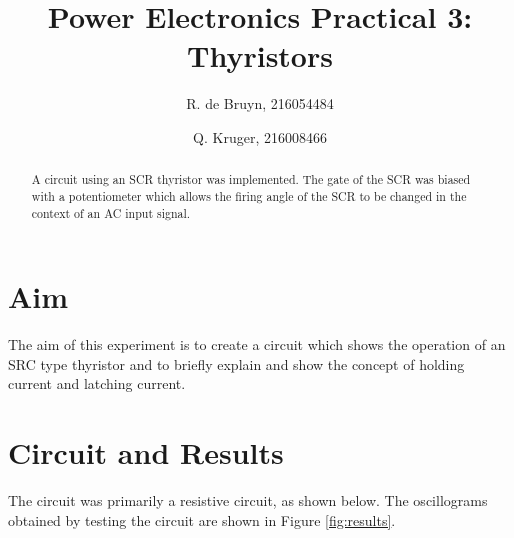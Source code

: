 \documentclass[journal]{IEEEtran}
\begin{document}
%
\title{Power Electronics Practical 3: Thyristors}
%
%
\author{R. de Bruyn, 216054484 \and Q. Kruger, 216008466}
%




\maketitle


\begin{abstract}
	A circuit using an SCR thyristor was implemented. The gate of the SCR
	was biased with a potentiometer which allows the firing angle of the
	SCR to be changed in the context of an AC input signal.
\end{abstract}

\section{Aim}

The aim of this experiment is to create a circuit which shows the operation of
an SRC type thyristor and to briefly explain and show the concept of holding
current and latching current.

\section{Circuit and Results}

The circuit was primarily a resistive circuit, as shown below. The oscillograms
obtained by testing the circuit are shown in Figure \ref{fig:results}.
\end{document}
